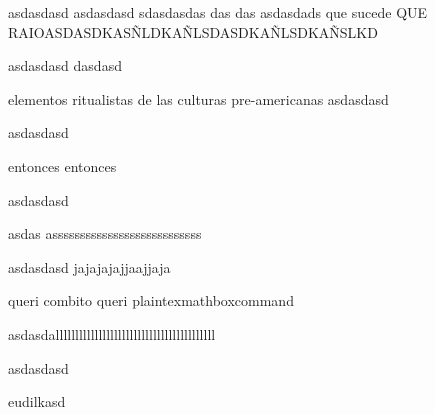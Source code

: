 \documentclass{article}
\begin{document}
\cite[]{Pyke_1977}asdasdasd asdasdasd  
sdasdasdas
das
das
\cite[]{Pyke_1977}asdasdads
que sucede QUE RAIOASDASDKASÑLDKAÑLSDASDKAÑLSDKAÑSLKD

asdasdasd
dasdasd

elementos ritualistas de las culturas pre-americanas
asdasdasd


asdasdasd

entonces
entonces

asdasdasd




asdas asssssssssssssssssssssssssss

asdasdasd
jajajajajjaajjaja

queri combito queri plaintexmathboxcommand


asdasdalllllllllllllllllllllllllllllllllllllllll


asdasdasd


eudilkasd

\newpage

 

\end{document}
